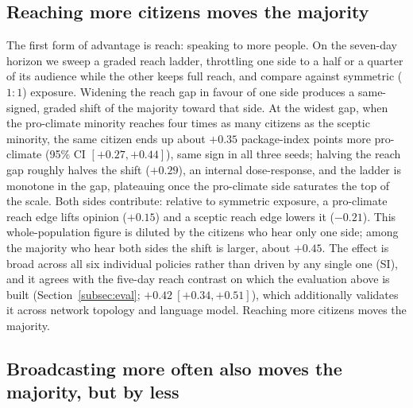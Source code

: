 \documentclass[pdflatex,sn-mathphys-num]{sn-jnl}%
\theoremstyle{thmstyleone}%
\theoremstyle{thmstyletwo}%
\theoremstyle{thmstylethree}%
\begin{document}
\subsection{Reaching more citizens moves the majority}\label{subsec:bite-reach}

The first form of advantage is reach: speaking to more people. On the seven-day horizon
we sweep a graded reach ladder, throttling one side to a half or a quarter of its
audience while the other keeps full reach, and compare against symmetric ($1{:}1$)
exposure. Widening the reach gap in favour of one side produces a same-signed, graded
shift of the majority toward that side. At the widest gap, when the pro-climate minority
reaches four times as many citizens as the sceptic minority, the same citizen ends up
about $+0.35$ package-index points more pro-climate (95\% CI $[+0.27, +0.44]$), same sign
in all three seeds; halving the reach gap roughly halves the shift ($+0.29$), an internal
dose-response, and the ladder is monotone in the gap, plateauing once the pro-climate
side saturates the top of the scale. Both sides contribute: relative to symmetric
exposure, a pro-climate reach edge lifts opinion ($+0.15$) and a sceptic reach edge
lowers it ($-0.21$). This whole-population figure is diluted by the citizens who hear
only one side; among the majority who hear both sides the shift is larger, about $+0.45$.
The effect is broad across all six individual policies rather than driven by any single
one (SI), and it agrees with the five-day reach contrast on which the evaluation above is
built (Section~\ref{subsec:eval}; $+0.42\ [+0.34, +0.51]$), which additionally validates
it across network topology and language model. Reaching more citizens moves the majority.

\subsection{Broadcasting more often also moves the majority, but by less}\label{subsec:bite-freq}
\end{document}
